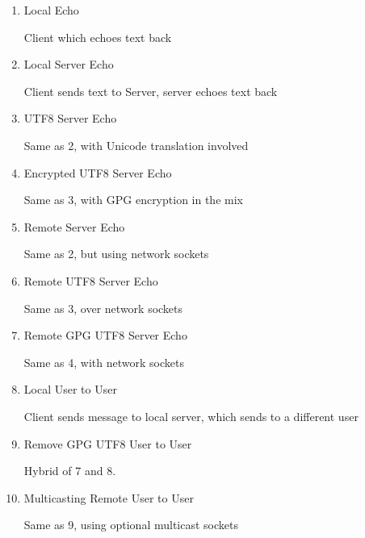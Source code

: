
\begin{table}[H]

\begin{center}

\begin{enumerate}


\item Local Echo 

	\subitem Client which echoes text back

\item Local Server Echo 

	\subitem Client sends text to Server, server echoes text back

\item UTF8 Server Echo 

	\subitem Same as 2, with Unicode translation involved

\item Encrypted UTF8 Server Echo 

	\subitem Same as 3, with GPG encryption in the mix

\item Remote Server Echo 

	\subitem Same as 2, but using network sockets

\item Remote UTF8 Server Echo 

	\subitem Same as 3, over network sockets

\item Remote GPG UTF8 Server Echo 

	\subitem Same as 4, with network sockets

\item Local User to User 

	\subitem Client sends message to local server, which sends to a 
	different user

\item Remove GPG UTF8 User to User 

	\subitem Hybrid of 7 and 8.

\item Multicasting Remote User to User 

	\subitem Same as 9, using optional multicast sockets

\end{enumerate}

\end{center}

\caption{List of Initial Milestones}

\end{table}
